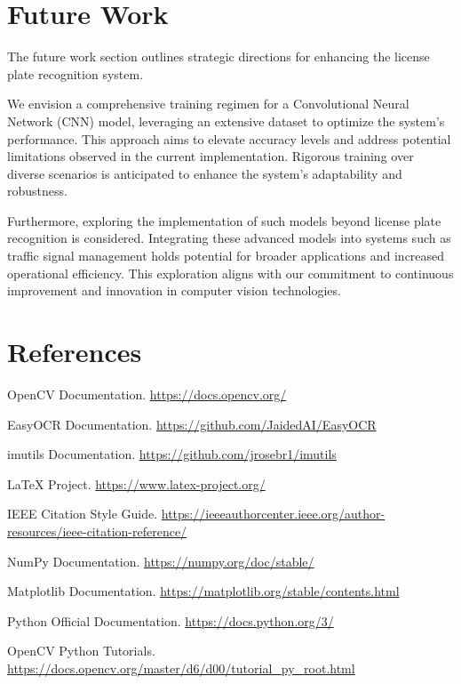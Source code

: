 \documentclass[conference]{IEEEtran}
\begin{document}
\section{Future Work}
The future work section outlines strategic directions for enhancing the license plate recognition system.

We envision a comprehensive training regimen for a Convolutional Neural Network (CNN) model, leveraging an extensive dataset to optimize the system's performance. This approach aims to elevate accuracy levels and address potential limitations observed in the current implementation. Rigorous training over diverse scenarios is anticipated to enhance the system's adaptability and robustness.

Furthermore, exploring the implementation of such models beyond license plate recognition is considered. Integrating these advanced models into systems such as traffic signal management holds potential for broader applications and increased operational efficiency. This exploration aligns with our commitment to continuous improvement and innovation in computer vision technologies.


\section{References}
\begin{thebibliography}{1}

OpenCV Documentation.
\newblock \url{https://docs.opencv.org/}

EasyOCR Documentation.
\newblock \url{https://github.com/JaidedAI/EasyOCR}

imutils Documentation.
\newblock \url{https://github.com/jrosebr1/imutils}

LaTeX Project.
\newblock \url{https://www.latex-project.org/}

IEEE Citation Style Guide.
\newblock \url{https://ieeeauthorcenter.ieee.org/author-resources/ieee-citation-reference/}

NumPy Documentation.
\newblock \url{https://numpy.org/doc/stable/}

Matplotlib Documentation.
\newblock \url{https://matplotlib.org/stable/contents.html}

Python Official Documentation.
\newblock \url{https://docs.python.org/3/}

OpenCV Python Tutorials.
\newblock \url{https://docs.opencv.org/master/d6/d00/tutorial_py_root.html}

\end{thebibliography}
\end{document}
